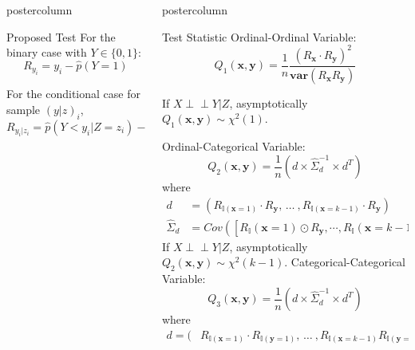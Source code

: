 \documentclass{beamer}
\def\ci{\perp\!\!\!\!\!\perp}
\newlength{\columnheight}
\begin{document}
\begin{frame}
\begin{columns}
\begin{column}{.33\textwidth}
\begin{beamercolorbox}[center]{postercolumn}
\begin{minipage}{.98\textwidth}
{\begin{myblock}{Proposed Test}
						For the binary case with $ Y \in \{0, 1\} $:
						$$ R_{y_i} = y_i - \hat{p}(Y = 1) $$

						For the conditional case for sample $ (y|z)_i $,
						$$ R_{y_i | z_i} = \hat{p}(Y < y_i | Z=z_i) - \hat{p}(Y>y_i|Z=z_i) $$
					\end{myblock}\vfill
		}\end{minipage}\end{beamercolorbox}
	\end{column}
	\begin{column}{.33\textwidth}
		\begin{beamercolorbox}[center]{postercolumn}
			\begin{minipage}{.98\textwidth} %
				\parbox[t][\columnheight]{\textwidth}{ %
					\begin{myblock}{Test Statistic}
						Ordinal-Ordinal Variable:
							$$ Q_1(\bm{x}, \bm{y}) = \frac{1}{n} \frac{(R_{\bm{x}} \cdot R_{\bm{y}})^2}{\bm{var}(R_{\bm{x}} R_{\bm{y}})} $$
								\begin{center} If $ X \ci Y | Z $, asymptotically $ Q_1(\bm{x}, \bm{y}) \sim \chi^2(1) $. \end{center}
						Ordinal-Categorical Variable:
							$$ Q_2(\bm{x}, \bm{y}) = \frac{1}{n} (d \times \hat{\Sigma}_d^{-1} \times d^T) $$
							where
							\begin{equation*}
								\begin{split}
								d &= (R_{\mathbb{I}(\mathbf{x}=1)} \cdot R_{\mathbf{y}}, \, \ldots \ , R_{\mathbb{I}(\mathbf{x}=k-1)} \cdot R_{\mathbf{y}}) \\ 
								\hat{\Sigma}_d &= Cov([R_\mathbb{I}(\mathbf{x}=1) \odot R_\mathbf{y}, \cdots, R_\mathbb{I}(\mathbf{x}=k-1) \odot R_\mathbf{y}])
								\end{split}
							\end{equation*}
								If $ X \ci Y | Z $, asymptotically $ Q_2(\bm{x}, \bm{y}) \sim \chi^2(k-1) $.
						Categorical-Categorical Variable:	
							$$ Q_3(\bm{x}, \bm{y}) = \frac{1}{n} (d \times \hat{\Sigma}_d^{-1} \times d^T) $$	
							where
							\begin{equation*}
								\begin{split}
								d = (&R_{\mathbb{I}(\mathbf{x}=1)} \cdot R_{\mathbb{I}(\mathbf{y}=1)}, \, \ldots \ ,
										R_{\mathbb{I}(\mathbf{x}=k-1)} R_{\mathbb{I}(\mathbf{y}=1)}, \, \ldots \, , \\

\end{split}
\end{equation*}
\end{myblock}}
\end{minipage}
\end{beamercolorbox}
\end{column}
\end{columns}
\end{frame}
\end{document}
